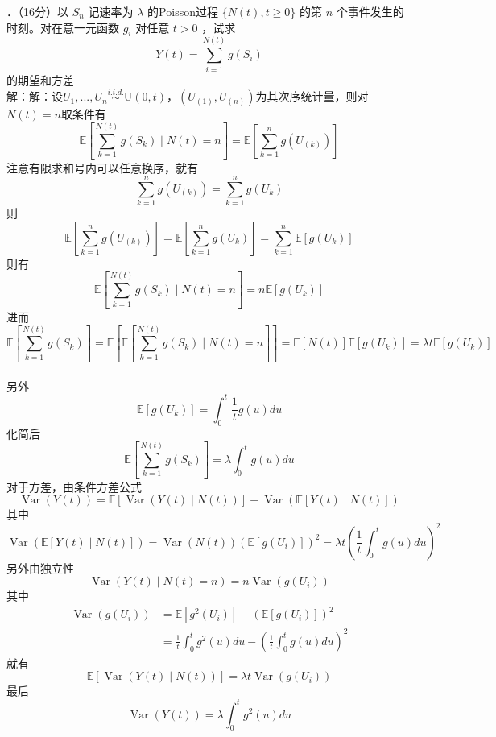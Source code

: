 \documentclass[UTF8]{ctexart}
\begin{document}
．（16分）以 $S_{n}$ 记速率为 $\lambda$ 的Poisson过程 $\{N(t), t \geq 0\}$ 的第 $n$ 个事件发生的时刻。对在意一元函数 $g_{i}$ 对任意 $t>0$ ，试求
$$
Y(t)=\sum_{i=1}^{N(t)} g\left(S_{i}\right)
$$
的期望和方差\\
解：解：设$U_1,...,U_n\stackrel{i.i.d.}{\sim }\mathrm{U}(0,t)$，$(U_{(1)},U_{(n)})$为其次序统计量，则对$N(t)=n$取条件有
\[
\mathbb{E}\left[\sum\limits_{k=1}^{N(t)}  g(S_k) \mid N(t)=n \right]=\mathbb{E}\left[\sum\limits_{k=1}^{n} g (U_{(k)}) \right]
\]
注意有限求和号内可以任意换序，就有
\[
\sum\limits_{k=1}^{n} g (U_{(k)})=\sum\limits_{k=1}^{n} g(U_{k}) 
\]
则
\[
\mathbb{E}\left[\sum\limits_{k=1}^{n} g (U_{(k)}) \right]=\mathbb{E}\left[\sum\limits_{k=1}^{n} g (U_{k}) \right]=\sum\limits_{k=1}^{n}\mathbb{E}\left[g (U_{k}) \right]
\]
则有
\[
\mathbb{E}\left[\sum\limits_{k=1}^{N(t)} g (S_k) \mid N(t)=n \right]=n\mathbb{E}[g(U_k)]
\]
进而
\[
\mathbb{E}\left[\sum\limits_{k=1}^{N(t)} g( S_k ) \right]=\mathbb{E}\left[\mathbb{E}\left[\sum\limits_{k=1}^{N(t)} g( S_k )\mid N(t)=n \right] \right] =\mathbb{E}[N(t)]\mathbb{E}[g(U_k)]=\lambda t\mathbb{E}[g(U_k)]
\]\\
另外
\[
\mathbb{E}[g(U_k)]=\int_{0}^{t} \frac{1}{t} g(u)du
\]
化简后
\[
\mathbb{E}\left[\sum\limits_{k=1}^{N(t)} g( S_k ) \right]=\lambda \int_{0}^{t}  g(u)du
\]
对于方差，由条件方差公式
\[
\operatorname{Var}(Y(t))=\mathbb{E}\left[\operatorname{Var}(Y(t)\mid N(t)) \right] +\operatorname{Var}\left(\mathbb{E}[Y(t)\mid N(t)] \right) 
\]
其中
\[
\operatorname{Var}\left(\mathbb{E}[Y(t)\mid N(t)] \right) =\operatorname{Var}(N(t))\left( \mathbb{E}[g(U_i)]\right)^2=\lambda t \left(\frac{1}{t} \int_{0}^{t} g(u)du \right)^2 
\]
另外由独立性
\[
\operatorname{Var}(Y(t)\mid N(t)=n)=n\operatorname{Var}(g(U_i))
\]
其中
\begin{align*}
	\operatorname{Var}(g(U_i))& = \mathbb{E}[g^2(U_i)]-\left(\mathbb{E}[g(U_i)] \right)^2  \\
	& = \frac{1}{t} \int_{0}^{t} g^2(u)du-\left(\frac{1}{t} \int_{0}^{t} g(u)du \right)^2 
\end{align*}
就有
\[
\mathbb{E}\left[\operatorname{Var}(Y(t)\mid N(t)) \right]=\lambda t \operatorname{Var}(g(U_i))
\]
最后
\[
\operatorname{Var}(Y(t))=\lambda \int_{0}^{t} g^2(u)du
\]\\
\end{document}
